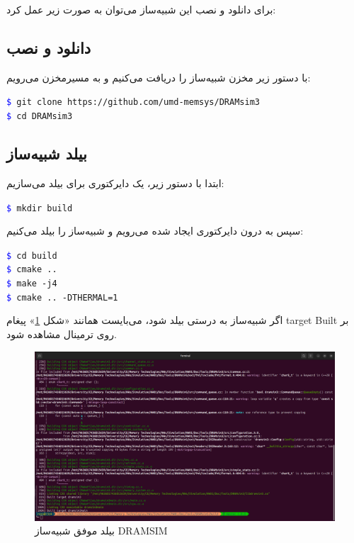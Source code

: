 \documentclass[12pt]{exam}
\begin{document}
\begin{questions}
برای دانلود و نصب این شبیه‌ساز می‌توان به صورت زیر عمل کرد:

\subsection{دانلود و نصب}

با دستور زیر مخزن شبیه‌ساز را دریافت می‌کنیم و به مسیرمخزن می‌رویم: \\
\begin{latin}
	\texttt{\textcolor{blue}{\$} git clone https://github.com/umd-memsys/DRAMsim3} \\
	\texttt{\textcolor{blue}{\$} cd DRAMsim3} \\
\end{latin}

\subsection{بیلد شبیه‌ساز}

ابتدا با دستور زیر، یک دایرکتوری برای بیلد می‌سازیم:\\
\begin{latin}
	\texttt{\textcolor{blue}{\$} mkdir build} \\
\end{latin}


سپس به درون دایرکتوری ایجاد شده می‌رویم و شبیه‌ساز را بیلد می‌کنیم:\\

\begin{latin}
	\texttt{\textcolor{blue}{\$} cd build} \\
	\texttt{\textcolor{blue}{\$} cmake ..} \\
	\texttt{\textcolor{blue}{\$} make -j4} \\
	\texttt{\textcolor{blue}{\$} cmake .. -DTHERMAL=1} \\
\end{latin}


اگر شبیه‌ساز به درستی بیلد شود، می‌بایست همانند «شکل \textcolor{blue}{\ref{بیلد موفق شبیه‌ساز DRAMSIM}}» پیغام target Built بر روی ترمینال مشاهده شود.


\begin{figure}[h]
	\centering
	\includegraphics[width=1\textwidth]{images/img12}
	\caption{بیلد موفق شبیه‌ساز DRAMSIM}
	\label{بیلد موفق شبیه‌ساز DRAMSIM}
\end{figure}



\end{questions}
\end{document}
